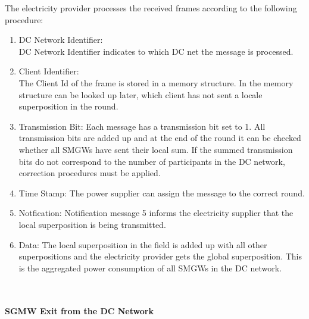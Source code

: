 The electricity provider processes the received frames according to the following procedure:\\
\begin{enumerate}
\item DC Network Identifier:\\
DC Network Identifier indicates to which DC net the message is processed.
\item Client Identifier:\\
The Client Id of the frame is stored in a memory structure. In the memory structure can be looked up later, which client has not sent a locale superposition in the round.
\item Transmission Bit: Each message has a transmission bit set to 1. All transmission bits are added up and at the end of the round it can be checked whether all SMGWs have sent their local sum. If the summed transmission bits do not correspond to the number of participants in the DC network, correction procedures must be applied.
\item Time Stamp: The power supplier can assign the message to the correct round.
\item Notfication: Notification message 5 informs the electricity supplier that the local superposition is being transmitted.
\item Data:
The local superposition in the field is added up with all other superpositions and the electricity provider gets the global superposition. This is the aggregated power consumption of all SMGWs in the DC network.
\end{enumerate}
\\
\\
\textbf{SGMW Exit from the DC Network}
\\
\\
